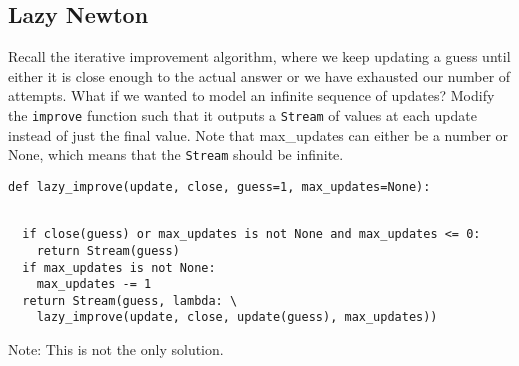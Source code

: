 \subsection*{Lazy Newton}
\begin{questions}
\question
Recall the iterative improvement algorithm, where we keep updating a guess until either it is close enough to the actual answer or we have exhausted our number of attempts. What if we wanted to model an infinite sequence of updates? Modify the {\tt improve} function such that it outputs a {\tt Stream} of values at each update instead of just the final value. Note that max\_updates can either be a number or None, which means that the {\tt Stream} should be infinite.
\begin{lstlisting}
def lazy_improve(update, close, guess=1, max_updates=None):
\end{lstlisting}
\begin{solution}[1.5in]
\begin{lstlisting}

  if close(guess) or max_updates is not None and max_updates <= 0:
    return Stream(guess)
  if max_updates is not None:
    max_updates -= 1
  return Stream(guess, lambda: \
    lazy_improve(update, close, update(guess), max_updates))
\end{lstlisting}

Note: This is not the only solution.
\end{solution}
\end{questions}

